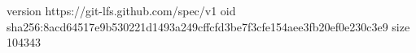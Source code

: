 version https://git-lfs.github.com/spec/v1
oid sha256:8acd64517e9b530221d1493a249cffcfd3be7f3cfe154aee3fb20ef0e230c3e9
size 104343

